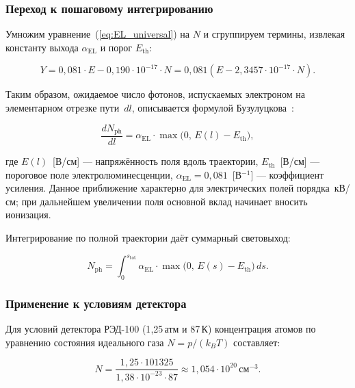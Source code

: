 \documentclass[12pt]{article}
\begin{document}
\subsubsection{Переход к пошаговому интегрированию}

Умножим уравнение~(\ref{eq:EL_universal}) на $N$ и сгруппируем термины,
извлекая константу выхода $\alpha_\text{EL}$ и порог $E_\text{th}$:

\begin{equation}
  Y = 0{,}081 \cdot E - 0{,}190 \cdot 10^{-17} \cdot N
    = 0{,}081 \left( E - 2{,}3457 \cdot 10^{-17} \cdot N \right).
  \label{eq:EL_linear}
\end{equation}

Таким образом, ожидаемое число фотонов, испускаемых электроном на
элементарном отрезке пути~$dl$, описывается формулой
Бузулуцкова~\cite{Buzulutskov2012}:

\begin{equation}
  \frac{dN_\text{ph}}{dl} = \alpha_\text{EL} \cdot \max\bigl(0,\, E(l) - E_\text{th}\bigr),
  \label{eq:EL}
\end{equation}

где $E(l)$~[В/см] --- напряжённость поля вдоль траектории,
$E_\text{th}$~[В/см] --- пороговое поле электролюминесценции,
$\alpha_\text{EL} = 0{,}081$~[В$^{-1}$] --- коэффициент усиления.
Данное приближение характерно для электрических полей порядка~кВ/см;
при дальнейшем увеличении поля основной вклад начинает вносить ионизация.

Интегрирование по полной траектории даёт суммарный световыход:

\begin{equation}
  N_\text{ph} = \int_0^{s_\text{tot}} \alpha_\text{EL} \cdot
    \max\bigl(0,\, E(s) - E_\text{th}\bigr)\, ds.
  \label{eq:EL_total}
\end{equation}

\subsubsection{Применение к условиям детектора}

Для условий детектора РЭД-100 (1{,}25\,атм и 87\,К) концентрация атомов
по уравнению состояния идеального газа $N = p / (k_B T)$ составляет:

\begin{equation}
  N = \frac{1{,}25 \cdot 101325}{1{,}38 \cdot 10^{-23} \cdot 87}
    \approx 1{,}054 \cdot 10^{20}\,\text{см}^{-3}.
  \label{eq:N}
\end{equation}
\end{document}
